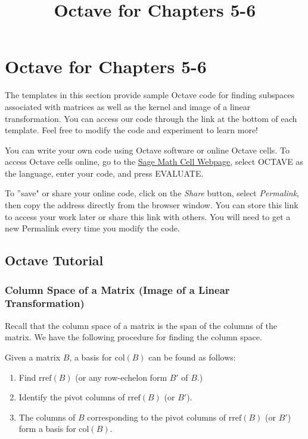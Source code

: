 \documentclass{ximera}
\title{Octave for Chapters 5-6} \license{CC BY-NC-SA 4.0}
\begin{document}
\begin{abstract}
\end{abstract}
\maketitle

\section*{Octave for Chapters 5-6}

The templates in this section provide sample Octave code for finding subspaces associated with matrices as well as the kernel and image of a linear transformation. You can access our code through the link at the bottom of each template.  Feel free to modify the code and experiment to learn more!  

You can write your own code using Octave software or online Octave cells.  To access Octave cells online, go to the \href{https://sagecell.sagemath.org/}{Sage Math Cell Webpage}, select OCTAVE as the language, enter your code, and press EVALUATE.  

To ''save" or share your online code, click on the \emph{Share} button, select \emph{Permalink}, then copy the address directly from the browser window.  You can store this link to access your work later or share this link with others.  You will need to get a new Permalink every time you modify the code.

\subsection*{Octave Tutorial}
\subsubsection*{Column Space of a Matrix (Image of a Linear Transformation)}
Recall that the column space of a matrix is the span of the columns of the matrix.  We have the following procedure for finding the column space.

\begin{procedure}[\ref{proc:colspace}]
Given a matrix $B$, a basis for $\mbox{col}(B)$ can be found as follows:
\begin{enumerate}
\item Find $\mbox{rref}(B)$ (or any row-echelon form $B'$ of $B$.)
\item Identify the pivot columns of $\mbox{rref}(B)$ (or $B'$).
\item The columns of $B$ corresponding to the pivot columns of $\mbox{rref}(B)$ (or $B'$) form a basis for $\mbox{col}(B)$.
\end{enumerate}
\end{procedure}
\end{document}
